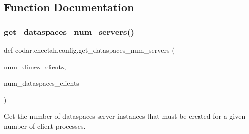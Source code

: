 \subsection{Function Documentation}
\mbox{\label{namespacecodar_1_1cheetah_1_1config_a777b4339975017c9521b943afd76748d}} 
\subsubsection{\texorpdfstring{get\+\_\+dataspaces\+\_\+num\+\_\+servers()}{get\_dataspaces\_num\_servers()}}
{\footnotesize\ttfamily def codar.\+cheetah.\+config.\+get\+\_\+dataspaces\+\_\+num\+\_\+servers (\begin{DoxyParamCaption}\item[{}]{num\+\_\+dimes\+\_\+clients,  }\item[{}]{num\+\_\+dataspaces\+\_\+clients }\end{DoxyParamCaption})}

\begin{DoxyVerb}Get the number of dataspaces server instances that must be created for a
given number of client processes.
\end{DoxyVerb}
 